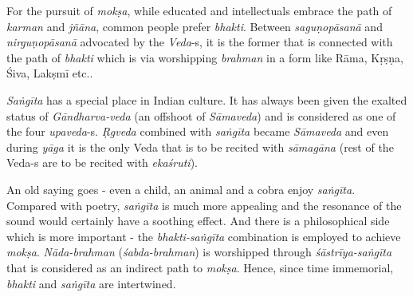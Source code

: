 For the pursuit of \textit{mokṣa}, while educated and intellectuals embrace the path of \textit{karman} and \textit{jñāna}, common people prefer \textit{bhakti}. Between \textit{saguṇopāsanā} and \textit{nirguṇopāsanā} advocated by the \textit{Veda}-s, it is the former that is connected with the path of \textit{bhakti} which is via worshipping \textit{brahman} in a form like Rāma, Kṛṣṇa, Śiva, Lakṣmī etc..

\textit{Saṅgīta} has a special place in Indian culture. It has always been given the exalted status of \textit{Gāndharva-veda} (an offshoot of \textit{Sāmaveda}) and is considered as one of the four \textit{upaveda}-s. \textit{Ṛgveda} combined with \textit{saṅgīta} became \textit{Sāmaveda} and even during \textit{yāga} it is the only Veda that is to be recited with \textit{sāmagāna} (rest of the Veda-s are to be recited with \textit{ekaśruti}).

An old saying goes - even a child, an animal and a cobra enjoy \textit{saṅgīta}. Compared with poetry, \textit{saṅgīta} is much more appealing and the resonance of the sound would certainly have a soothing effect. And there is a philosophical side which is more important - the \textit{bhakti-saṅgīta} combination is employed to achieve \textit{mokṣa}. \textit{Nāda-brahman} (\textit{śabda-brahman}) is worshipped through \textit{śāstrīya-saṅgīta} that is considered as an indirect path to \textit{mokṣa}. Hence, since time immemorial, \textit{bhakti} and \textit{saṅgīta} are intertwined. 

